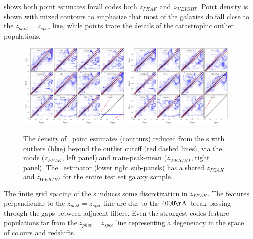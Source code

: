  shows both point estimates forall codes  both $z_{PEAK}$ and $z_{WEIGHT}$.
Point density is shown with mixed contours to emphasize that most of the galaxies do fall close to the $z_{phot} = z_{spec}$ line, while points trace the details of the catastrophic outlier populations.

\begin{figure}
	\centering
	\includegraphics[width=0.49\textwidth]{figures/pzdc1/ZPEAK_szpz_threecolumn_12codes_navy_lowalpha.jpg}
	\includegraphics[width=0.49\textwidth]{figures/pzdc1/ZWEIGHT_szpz_threecolumn_12codes_navy_lowalpha.jpg}
	\caption{The density of \pz\ point estimates (contours) reduced from the \pzpdf s with outliers (blue) beyond the outlier cutoff (red dashed lines), via the mode ($z_{PEAK}$, left panel) and main-peak-mean ($z_{WEIGHT}$, right panel).
		The \trainz\ estimator (lower right sub-panels) has a shared $z_{PEAK}$ and $z_{WEIGHT}$ for the entire test set galaxy sample.}
\end{figure}

The finite grid spacing of the \pzpdf s induces some discretization in $z_{PEAK}$.%
The features perpendicular to the $z_{phot} = z_{spec}$ line are due to the $4000 \rm{\AA}$ break passing through the gaps between adjacent filters.%
Even the strongest codes feature populations far from the $z_{phot} = z_{spec}$ line representing a degeneracy in the space of colours and redshifts.

